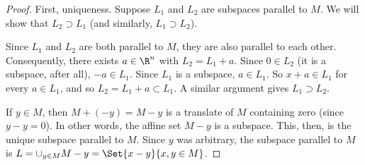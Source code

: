 \begin{proof}First, uniqueness.
Suppose $L_1$ and $L_2$ are subspaces parallel to $M$.
We will show that $L_2 \supset L_1$ (and similarly, $L_1 \supset L_2$).

Since $L_1$ and $L_2$ are both parallel to $M$, they are also parallel to each other.
Consequently, there exists $a \in \R ^n$ with $L_2 = L_1 + a$.
Since $0 \in L_2$ (it is a subspace, after all), $-a \in L_1$.
Since $L_1$ is a subspace, $a \in L_1$.
So $x + a \in L_1$ for every $a \in L_1$, and so $L_2 = L_1 + a \subset L_1$.
A similar argument gives $L_1 \supset L_2$.

If $y \in M$, then $M + (-y) = M - y$ is a translate of $M$ containing zero (since $y - y = 0$).
In other words, the affine set $M - y$ is a subspace.
This, then, is the unique subspace parallel to $M$.
Since $y$ was arbitrary, the subspace parallel to $M$ is $L = \cup_{y \in M} M - y = \Set{x - y}{x,y \in M}$.\end{proof}